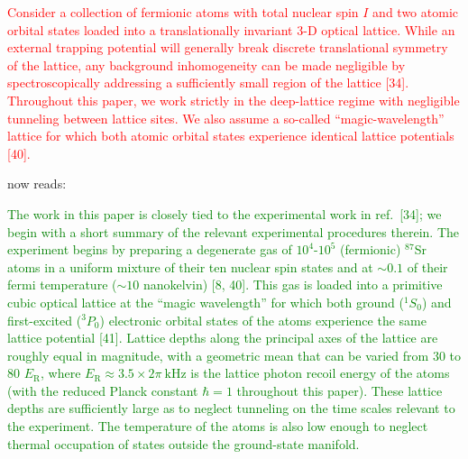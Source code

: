 \documentclass[preprint]{revtex4-1}
\renewcommand{\t}{\text} %
\newcommand{\1}{\mathds{1}}
\newcommand{\red}[1]{\textcolor{red}{#1}}
\newcommand{\green}[1]{\textcolor{green}{#1}}
\begin{document}
\begin{enumerate}
  \red{Consider a collection of fermionic atoms with total nuclear
    spin $I$ and two atomic orbital states loaded into a
    translationally invariant 3-D optical lattice.  While an external
    trapping potential will generally break discrete translational
    symmetry of the lattice, any background inhomogeneity can be made
    negligible by spectroscopically addressing a sufficiently small
    region of the lattice [34].  Throughout this paper, we work
    strictly in the deep-lattice regime with negligible tunneling
    between lattice sites.  We also assume a so-called
    ``magic-wavelength'' lattice for which both atomic orbital states
    experience identical lattice potentials [40].}

  now reads:

  \green{The work in this paper is closely tied to the experimental
    work in ref.~[34]; we begin with a short summary of the relevant
    experimental procedures therein.  The experiment begins by
    preparing a degenerate gas of $10^4$-$10^5$ (fermionic)
    ${}^{87}$Sr atoms in a uniform mixture of their ten nuclear spin
    states and at $\sim0.1$ of their fermi temperature ($\sim10$
    nanokelvin) [8, 40].  This gas is loaded into a primitive cubic
    optical lattice at the ``magic wavelength'' for which both ground
    (${}^1S_0$) and first-excited (${}^3P_0$) electronic orbital
    states of the atoms experience the same lattice potential [41].
    Lattice depths along the principal axes of the lattice are roughly
    equal in magnitude, with a geometric mean that can be varied from
    30 to 80 $E_{\t{R}}$, where
    $E_{\t{R}}\approx3.5\times2\pi~\t{kHz}$ is the lattice photon
    recoil energy of the atoms (with the reduced Planck constant
    $\hbar=1$ throughout this paper).  These lattice depths are
    sufficiently large as to neglect tunneling on the time scales
    relevant to the experiment.  The temperature of the atoms is also
    low enough to neglect thermal occupation of states outside the
    ground-state manifold.}


\end{enumerate}
\end{document}
